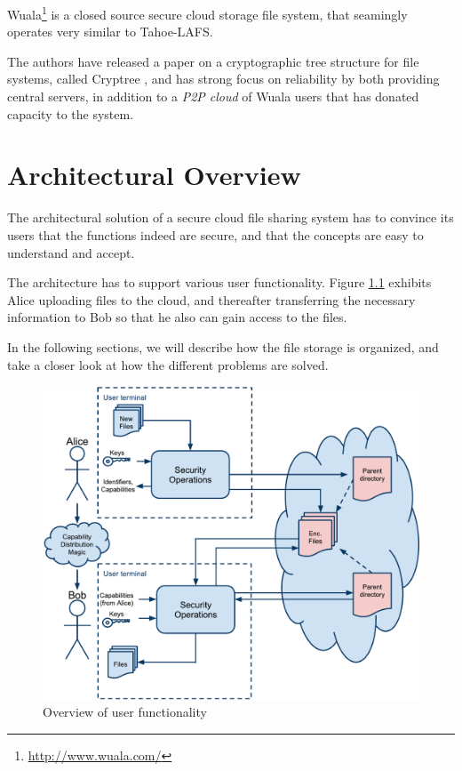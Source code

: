 \documentclass[pdftex,english,10pt,b5paper,twoside]{book}
\begin{document}
Wuala\footnote{\url{http://www.wuala.com/}} is a closed source secure cloud
storage file system, that seamingly operates very similar to Tahoe-\ac{LAFS}.

The authors have released a paper on a cryptographic tree structure for file
systems, called Cryptree \cite{cryptree}, and has strong focus on reliability
by both providing central servers, in addition to a \emph{P2P cloud} of Wuala
users that has donated capacity to the system. 

\chapter{Architectural Overview}
\label{chap:AS}

The architectural solution of a secure cloud file sharing system has to convince
its users that the functions indeed are secure, and that the concepts are easy
to understand and accept. 

The architecture has to support various user functionality. Figure
\ref{fig:AS:overview} exhibits Alice uploading files to the cloud, and
thereafter transferring the necessary information to Bob so that he also can
gain access to the files.

In the following sections, we will describe how the file storage is organized,
and take a closer look at how the different problems are solved.

\begin{figure}[h!]
    \centering
    \includegraphics[width=\columnwidth]{ArchitectureOverview.pdf}
    \caption{Overview of user functionality}
    \label{fig:AS:overview}
\end{figure}
\end{document}
